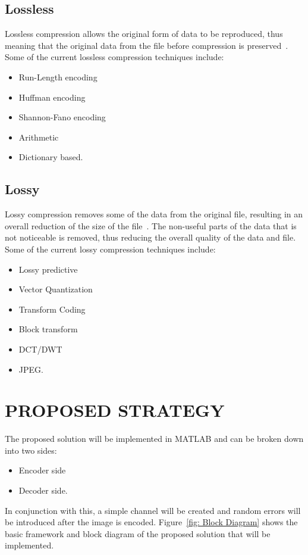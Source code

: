 \documentclass[10pt,twocolumn]{witseiepaper}
\begin{document}
\subsection{Lossless}
\label{sec: Lossless}
Lossless compression allows the original form of data to be reproduced, thus meaning that the original data from the file before compression is preserved~\cite{Loss}. Some of the current lossless compression techniques include:
\begin{itemize}
\item Run-Length encoding
\item Huffman encoding
\item Shannon-Fano encoding
\item Arithmetic
\item Dictionary based.
\end{itemize}


\subsection{Lossy}
\label{sec: Lossy}
Lossy compression removes some of the data from the original file, resulting in an overall reduction of the size of the file~\cite{Loss}. The non-useful parts of the data that is not noticeable is removed, thus reducing the overall quality of the data and file. Some of the current lossy compression techniques include:
\begin{itemize}
\item Lossy predictive
\item Vector Quantization
\item Transform Coding
\item Block transform
\item DCT/DWT
\item JPEG.
\end{itemize}

%
\section{PROPOSED STRATEGY}
\label{sec: Proposed Strategy}
The proposed solution will be implemented in MATLAB and can be broken down into two sides:
\begin{itemize}
\item Encoder side
\item Decoder side.
\end{itemize}
In conjunction with this, a simple channel will be created and random errors will be introduced after the image is encoded. Figure~\ref{fig: Block Diagram} shows the basic framework and block diagram of the proposed solution that will be implemented.
\end{document}
